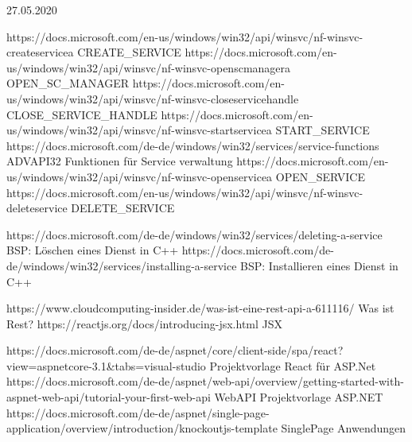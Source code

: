 27.05.2020 

https://docs.microsoft.com/en-us/windows/win32/api/winsvc/nf-winsvc-createservicea 			CREATE_SERVICE
https://docs.microsoft.com/en-us/windows/win32/api/winsvc/nf-winsvc-openscmanagera 			OPEN_SC_MANAGER
https://docs.microsoft.com/en-us/windows/win32/api/winsvc/nf-winsvc-closeservicehandle 		CLOSE_SERVICE_HANDLE
https://docs.microsoft.com/en-us/windows/win32/api/winsvc/nf-winsvc-startservicea 			START_SERVICE
https://docs.microsoft.com/de-de/windows/win32/services/service-functions 					ADVAPI32 Funktionen für Service verwaltung
https://docs.microsoft.com/en-us/windows/win32/api/winsvc/nf-winsvc-openservicea 			OPEN_SERVICE
https://docs.microsoft.com/en-us/windows/win32/api/winsvc/nf-winsvc-deleteservice			DELETE_SERVICE

https://docs.microsoft.com/de-de/windows/win32/services/deleting-a-service					BSP: Löschen eines Dienst in C++
https://docs.microsoft.com/de-de/windows/win32/services/installing-a-service				BSP: Installieren eines Dienst in C++


https://www.cloudcomputing-insider.de/was-ist-eine-rest-api-a-611116/						Was ist Rest?
https://reactjs.org/docs/introducing-jsx.html												JSX


https://docs.microsoft.com/de-de/aspnet/core/client-side/spa/react?view=aspnetcore-3.1&tabs=visual-studio	Projektvorlage React für ASP.Net
https://docs.microsoft.com/de-de/aspnet/web-api/overview/getting-started-with-aspnet-web-api/tutorial-your-first-web-api WebAPI Projektvorlage ASP.NET
https://docs.microsoft.com/de-de/aspnet/single-page-application/overview/introduction/knockoutjs-template SinglePage Anwendungen